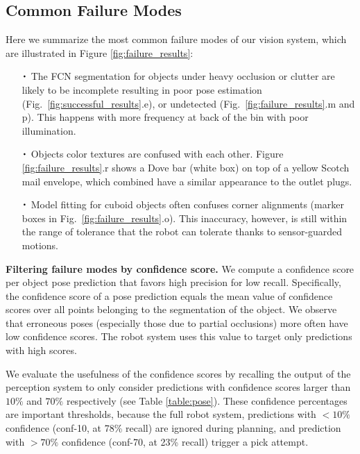 \documentclass[letterpaper, 10 pt, conference]{ieeeconf}  %
\newcommand*{\Cdot}{\raisebox{-0.25ex}{\scalebox{1.75}{$\cdot$}}}
\newcommand{\myparagraph}[1]{\vspace{0.1in}\noindent\textbf{#1}}
\begin{document}
\subsection{Common Failure Modes} 
Here we summarize the most common failure modes of our vision system, which are illustrated in Figure \ref{fig:failure_results}: 
\begin{itemize}
    \item[$\Cdot$] The FCN segmentation for objects under heavy occlusion or clutter are likely to be incomplete resulting in poor pose estimation (Fig.~\ref{fig:successful_results}.e), or undetected (Fig.~\ref{fig:failure_results}.m and p). This happens with more frequency at back of the bin with poor illumination. %
    \item[$\Cdot$] Objects color textures are confused with each other. Figure \ref{fig:failure_results}.r shows a Dove bar (white box) on top of a yellow Scotch mail envelope, which combined have a similar appearance to the outlet plugs.
    \item[$\Cdot$] Model fitting for cuboid objects often confuses corner alignments (marker boxes in Fig.~\ref{fig:failure_results}.o). This inaccuracy, however, is still within the range of tolerance that the robot can tolerate thanks to sensor-guarded motions.
\end{itemize}




\myparagraph{Filtering failure modes by confidence score.} 
We compute a confidence score per object pose prediction that favors high precision for low recall. 
Specifically, the confidence score of a pose prediction equals the mean value of confidence scores over all points belonging to the segmentation of the object. 
We observe that erroneous poses (especially those due to partial occlusions) more often have low confidence scores.
The robot system uses this value to target only predictions with high scores.

We evaluate the usefulness of the confidence scores by recalling the output of the perception system to only consider predictions with confidence scores larger than $10\%$ and $70\%$ respectively (see Table \ref{table:pose}). 
These confidence percentages are important thresholds, because the full robot system, predictions with $< 10\%$ confidence (conf-10, at 78\% recall) are ignored during planning, and prediction with $> 70\%$ confidence (conf-70, at 23\% recall) trigger a pick attempt.
\end{document}

